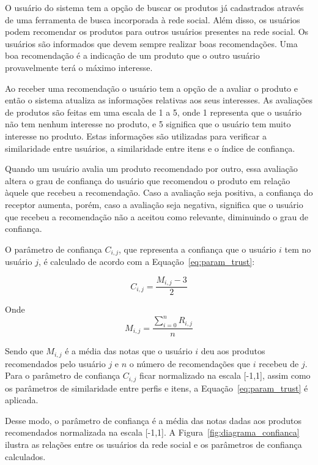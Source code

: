   O usuário do sistema tem a opção de buscar os produtos já cadastrados através de uma ferramenta de busca incorporada à rede social. Além disso, os usuários podem recomendar os produtos para outros usuários presentes na rede social. Os usuários são informados que devem sempre realizar boas recomendações. Uma boa recomendação é a indicação de um produto que o outro usuário provavelmente terá o máximo interesse.

 Ao receber uma recomendação o usuário tem a opção de a avaliar o produto e então o sistema atualiza as informações relativas aos seus interesses. As avaliações de produtos são feitas em uma escala de 1 a 5, onde 1 representa que o usuário não tem nenhum interesse no produto, e 5 significa que o usuário tem muito interesse no produto. Estas informações são utilizadas para verificar a similaridade entre usuários, a similaridade entre itens e o índice de confiança.
 
 Quando um usuário avalia um produto recomendado por outro, essa avaliação altera o grau de confiança do usuário que recomendou o produto em relação àquele que recebeu a recomendação. Caso a avaliação seja positiva, a confiança do receptor aumenta, porém, caso a avaliação seja negativa, significa que o usuário que recebeu a recomendação não a aceitou como relevante, diminuindo o grau de confiança.

 O parâmetro de confiança $C_{i,j}$, que representa a confiança que o usuário $i$ tem no usuário $j$, é calculado de acordo com a Equação~\ref{eq:param_trust}:
 
\begin{equation}
 C_{i,j} = \frac{M_{i,j} - 3}{2}
 \label{eq:param_trust} 
\end{equation}

 Onde
\begin{equation}
 M_{i,j} = \frac{{\sum_{i=0}^n}R_{i,j}}{n}
 \label{eq:media_notas}
\end{equation}

 Sendo que $M_{i,j}$ é a média das notas que o usuário $i$ deu aos produtos recomendados pelo usuário $j$ e $n$ o número de recomendações que $i$ recebeu de $j$. Para o parâmetro de confiança $C_{i,j}$ ficar normalizado na escala [-1,1], assim como os parâmetros de similaridade entre perfis e itens, a Equação~\ref{eq:param_trust} é aplicada.

 Desse modo, o parâmetro de confiança é a média das notas dadas aos produtos recomendados normalizada na escala [-1,1]. A Figura~\ref{fig:diagrama_confianca} ilustra as relações entre os usuários da rede social e os parâmetros de confiança calculados.
 
